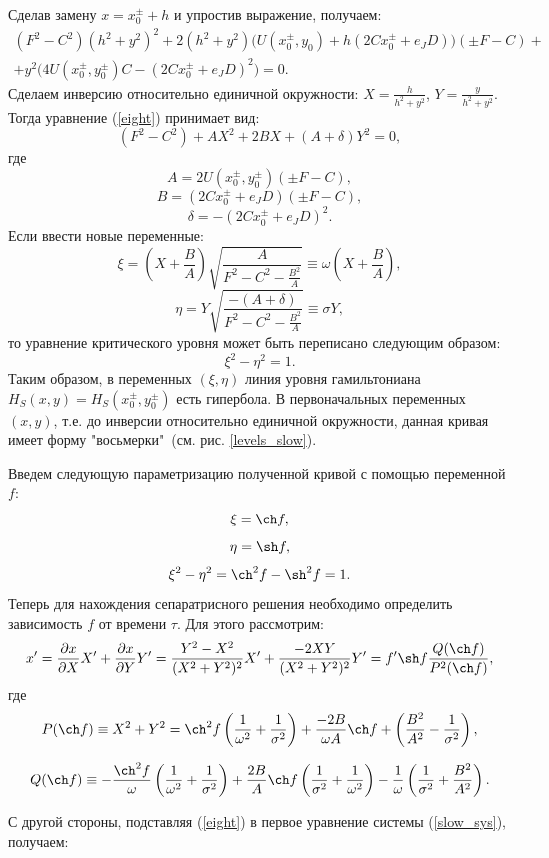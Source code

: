 Сделав замену $x = x_0^{\pm} + h$ и упростив выражение, получаем:
\begin{multline}
(F^2-C^2)(h^2+y^2)^2+2(h^2+y^2) \big(U(x_0^{\pm}, y_0)+h(2Cx_0^{\pm}+e_JD) \big) (\pm F - C)+\\ 
+ y^2 \big(4U(x_0^{\pm},y_0^{\pm})C-(2Cx_0^{\pm}+e_JD)^2 \big) = 0.
\label{eight}
\end{multline}
Сделаем инверсию относительно единичной окружности: $X=\frac{h}{h^2+y^2}$, $Y=\frac{y}{h^2+y^2}$. Тогда уравнение (\ref{eight}) принимает вид:
$$(F^2-C^2)+AX^2+2BX+(A+\delta)Y^2=0,$$
где
$$A = 2 U(x_0^{\pm}, y_0^{\pm})(\pm F - C),$$
$$B = (2Cx_0^{\pm}+e_J D)(\pm F - C),$$
$$\delta = -(2Cx_0^{\pm}+e_J D)^2.$$
Если ввести новые переменные:
$$\xi  = \left( X+\frac{B}{A} \right) \sqrt{\frac{A}{F^2-C^2-\frac{B^2}{A}}} \equiv \omega \left( X+\frac{B}{A} \right),$$
$$\eta = Y \sqrt{\frac{-(A+\delta)}{F^2-C^2-\frac{B^2}{A}}} \equiv \sigma Y,$$
то уравнение критического уровня может быть переписано следующим образом:
\begin{equation}
\label{hyper}
\xi^2-\eta^2=1.
\end{equation}
Таким образом, в переменных $(\xi, \eta)$ линия уровня гамильтониана $H_S(x,y) = H_S(x_0^{\pm},y_0^{\pm})$ есть гипербола. В первоначальных переменных  $(x, y)$, т.е. до инверсии относительно единичной окружности, данная кривая имеет форму "восьмерки"\, (см. рис. \ref{levels_slow}).

Введем следующую параметризацию полученной кривой с помощью переменной $f$:
$$\xi = \ch f,$$
$$\eta = \sh f,$$
$$\xi^2-\eta^2 = \ch^2f - \sh^2f = 1.$$
Теперь для нахождения сепаратрисного решения необходимо определить зависимость $f$ от времени $\tau$. Для этого рассмотрим:
\begin{equation}
\label{der_x_1}
x' = \frac{\partial x}{\partial X}X'+\frac{\partial x}{\partial Y}Y' = \frac{Y^2-X^2}{(X^2+Y^2)^2}X' + \frac{-2XY}{(X^2+Y^2)^2}Y' = f' \sh f \frac{Q(\ch f)}{P^2(\ch f)},
\end{equation}
где
$$P(\ch f) \equiv X^2+Y^2 = \ch^2 f \left( \frac{1}{\omega^2} + \frac{1}{\sigma^2} \right) + \frac{-2B }{\omega A}\ch f + \left( \frac{B^2}{A^2}-\frac{1}{\sigma^2} \right),$$

$$Q(\ch f) \equiv  -\frac{\ch^2 f}{\omega} \left( \frac{1}{\omega^2}+\frac{1}{\sigma^2} \right) + \frac{2B}{A} \ch f \left( \frac{1}{\sigma^2}+\frac{1}{\omega^2} \right) - \frac{1}{\omega} \left( \frac{1}{\sigma^2} + \frac{B^2}{A^2} \right).$$

С другой стороны, подставляя (\ref{eight}) в первое уравнение системы (\ref{slow_sys}), получаем:

